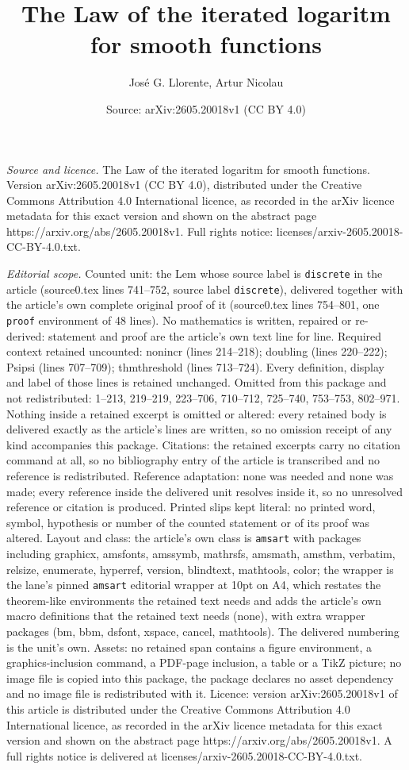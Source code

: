 \documentclass[10pt,a4paper]{amsart}
\title[The Law of the iterated logaritm for smooth functions]{The Law of the iterated logaritm for smooth functions}
\author{Jos\'e G. Llorente, Artur Nicolau}
\date{Source: arXiv:2605.20018v1 (CC BY 4.0)}
\begin{document}
\maketitle

\noindent\emph{Source and licence.} The Law of the iterated logaritm for smooth functions. Version arXiv:2605.20018v1 (CC BY 4.0), distributed under the Creative Commons Attribution 4.0 International licence, as recorded in the arXiv licence metadata for this exact version and shown on the abstract page https://arxiv.org/abs/2605.20018v1. Full rights notice: licenses/arxiv-2605.20018-CC-BY-4.0.txt.\par\smallskip

\noindent\textit{Editorial scope.} Counted unit: the Lem whose source label is \texttt{discrete} in the article (source0.tex lines 741--752, source label \texttt{discrete}), delivered together with the article's own complete original proof of it (source0.tex lines 754--801, one \texttt{proof} environment of 48 lines). No mathematics is written, repaired or re-derived: statement and proof are the article's own text line for line. Required context retained uncounted: nonincr (lines 214--218); doubling (lines 220--222); Psipsi (lines 707--709); thmthreshold (lines 713--724). Every definition, display and label of those lines is retained unchanged. Omitted from this package and not redistributed: 1--213, 219--219, 223--706, 710--712, 725--740, 753--753, 802--971. Nothing inside a retained excerpt is omitted or altered: every retained body is delivered exactly as the article's lines are written, so no omission receipt of any kind accompanies this package. Citations: the retained excerpts carry no citation command at all, so no bibliography entry of the article is transcribed and no reference is redistributed. Reference adaptation: none was needed and none was made; every reference inside the delivered unit resolves inside it, so no unresolved reference or citation is produced. Printed slips kept literal: no printed word, symbol, hypothesis or number of the counted statement or of its proof was altered. Layout and class: the article's own class is \texttt{amsart} with packages including graphicx, amsfonts, amssymb, mathrsfs, amsmath, amsthm, verbatim, relsize, enumerate, hyperref, version, blindtext, mathtools, color; the wrapper is the lane's pinned \texttt{amsart} editorial wrapper at 10pt on A4, which restates the theorem-like environments the retained text needs and adds the article's own macro definitions that the retained text needs (none), with extra wrapper packages (bm, bbm, dsfont, xspace, cancel, mathtools). The delivered numbering is the unit's own. Assets: no retained span contains a figure environment, a graphics-inclusion command, a PDF-page inclusion, a table or a TikZ picture; no image file is copied into this package, the package declares no asset dependency and no image file is redistributed with it. Licence: version arXiv:2605.20018v1 of this article is distributed under the Creative Commons Attribution 4.0 International licence, as recorded in the arXiv licence metadata for this exact version and shown on the abstract page https://arxiv.org/abs/2605.20018v1. A full rights notice is delivered at licenses/arxiv-2605.20018-CC-BY-4.0.txt. 
\end{document}
